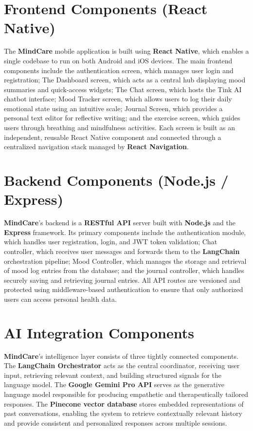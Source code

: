 \documentclass[a4paper,12pt]{report}
\begin{document}
\section{Frontend Components (React Native)}
The \textbf{MindCare} mobile application is built using \textbf{React Native}, which enables a single codebase to run on both Android and iOS devices. The main frontend components include the authentication screen, which manages user login and registration; The Dashboard screen, which acts as a central hub displaying mood summaries and quick-access widgets; The Chat screen, which hosts the Tink AI chatbot interface; Mood Tracker screen, which allows users to log their daily emotional state using an intuitive scale; Journal Screen, which provides a personal text editor for reflective writing; and the exercise screen, which guides users through breathing and mindfulness activities. Each screen is built as an independent, reusable React Native component and connected through a centralized navigation stack managed by \textbf{React Navigation}.

\section{Backend Components (Node.js / Express)}
\textbf{MindCare}'s backend is a \textbf{RESTful API} server built with \textbf{Node.js} and the \textbf{Express} framework. Its primary components include the authentication module, which handles user registration, login, and JWT token validation; Chat controller, which receives user messages and forwards them to the \textbf{LangChain} orchestration pipeline; Mood Controller, which manages the storage and retrieval of mood log entries from the database; and the journal controller, which handles securely saving and retrieving journal entries. All API routes are versioned and protected using middleware-based authentication to ensure that only authorized users can access personal health data.

\section{AI Integration Components}
\textbf{MindCare}'s intelligence layer consists of three tightly connected components. The \textbf{LangChain Orchestrator} acts as the central coordinator, receiving user input, retrieving relevant context, and building structured signals for the language model. The \textbf{Google Gemini Pro API} serves as the generative language model responsible for producing empathetic and therapeutically tailored responses. The \textbf{Pinecone vector database} stores embedded representations of past conversations, enabling the system to retrieve contextually relevant history and provide consistent and personalized responses across multiple sessions.
\end{document}
